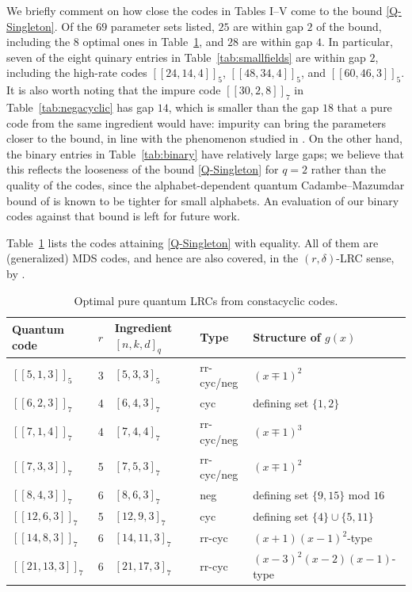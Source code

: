 \documentclass[journal,onecolumn]{IEEEtran}
\newcommand{\dsb}[1]{[\![#1]\!]}
\begin{document}
We briefly comment on how close the codes in Tables I--V come to the bound \eqref{Q-Singleton}. Of the $69$ parameter sets listed, $25$ are within gap $2$ of the bound, including the $8$ optimal ones in Table~\ref{tab:optimal}, and $28$ are within gap $4$. In particular, seven of the eight quinary entries in Table~\ref{tab:smallfields} are within gap $2$, including the high-rate codes $\dsb{24,14,4}_5$, $\dsb{48,34,4}_5$, and $\dsb{60,46,3}_5$. It is also worth noting that the impure code $\dsb{30,2,8}_7$ in Table~\ref{tab:negacyclic} has gap $14$, which is smaller than the gap $18$ that a pure code from the same ingredient would have: impurity can bring the parameters closer to the bound, in line with the phenomenon studied in \cite{Galindo2026}. On the other hand, the binary entries in Table~\ref{tab:binary} have relatively large gaps; we believe that this reflects the looseness of the bound \eqref{Q-Singleton} for $q=2$ rather than the quality of the codes, since the alphabet-dependent quantum Cadambe--Mazumdar bound of \cite{Luo2023} is known to be tighter for small alphabets. An evaluation of our binary codes against that bound is left for future work.

Table~\ref{tab:optimal} lists the codes attaining \eqref{Q-Singleton} with equality. All of them are (generalized) MDS codes, and hence are also covered, in the $(r,\delta)$-LRC sense, by \cite[Proposition~37]{Galindo2024}.

\begin{table}[!htbp]
\caption{Optimal pure quantum LRCs from constacyclic codes.}
\label{tab:optimal}
\centering
\renewcommand{\arraystretch}{1.15}
\begin{tabular}{lllll}
\toprule
Quantum code & $r$ & Ingredient $[n,k,d]_q$ & Type & Structure of $g(x)$ \\
\midrule
$[[5,1,3]]_5$   & 3 & $[5,3,3]_5$   & rr-cyc/neg & $(x\mp1)^2$ \\
$[[6,2,3]]_7$   & 4 & $[6,4,3]_7$   & cyc & defining set $\{1,2\}$ \\
$[[7,1,4]]_7$   & 4 & $[7,4,4]_7$   & rr-cyc/neg & $(x\mp1)^3$ \\
$[[7,3,3]]_7$   & 5 & $[7,5,3]_7$   & rr-cyc/neg & $(x\mp1)^2$ \\
$[[8,4,3]]_7$   & 6 & $[8,6,3]_7$   & neg & defining set $\{9,15\}$ mod $16$ \\
$[[12,6,3]]_7$  & 5 & $[12,9,3]_7$  & cyc & defining set $\{4\}\cup\{5,11\}$ \\
$[[14,8,3]]_7$  & 6 & $[14,11,3]_7$ & rr-cyc & $(x+1)(x-1)^2$-type \\
$[[21,13,3]]_7$ & 6 & $[21,17,3]_7$ & rr-cyc & $(x-3)^2(x-2)(x-1)$-type \\
\bottomrule
\end{tabular}
\end{table}
\end{document}
